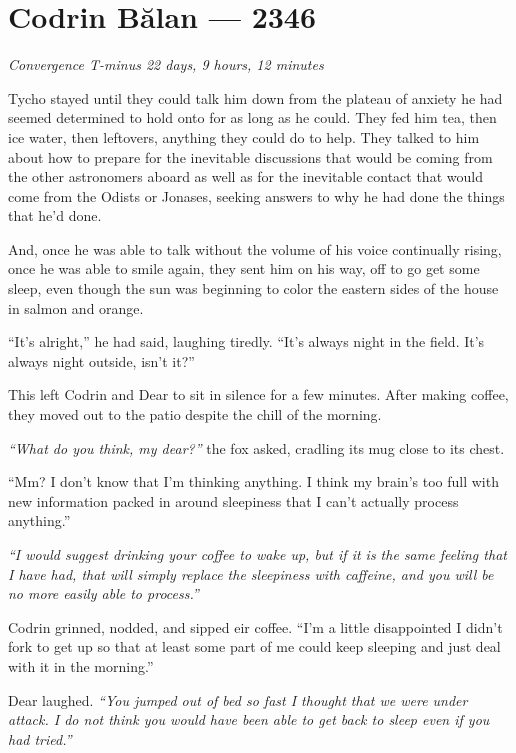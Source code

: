 \hypertarget{codrin-bux103lan-2346}{%
\chapter{Codrin Bălan — 2346}}

\begin{center}
\emph{Convergence T-minus 22 days, 9 hours, 12 minutes}
\end{center}

\noindent Tycho stayed until they could talk him down from the plateau of anxiety he had seemed determined to hold onto for as long as he could. They fed him tea, then ice water, then leftovers, anything they could do to help. They talked to him about how to prepare for the inevitable discussions that would be coming from the other astronomers aboard as well as for the inevitable contact that would come from the Odists or Jonases, seeking answers to why he had done the things that he'd done.

And, once he was able to talk without the volume of his voice continually rising, once he was able to smile again, they sent him on his way, off to go get some sleep, even though the sun was beginning to color the eastern sides of the house in salmon and orange.

``It's alright,'' he had said, laughing tiredly. ``It's always night in the field. It's always night outside, isn't it?''

This left Codrin and Dear to sit in silence for a few minutes. After making coffee, they moved out to the patio despite the chill of the morning.

\emph{``What do you think, my dear?''} the fox asked, cradling its mug close to its chest.

``Mm? I don't know that I'm thinking anything. I think my brain's too full with new information packed in around sleepiness that I can't actually process anything.''

\emph{``I would suggest drinking your coffee to wake up, but if it is the same feeling that I have had, that will simply replace the sleepiness with caffeine, and you will be no more easily able to process.''}

Codrin grinned, nodded, and sipped eir coffee. ``I'm a little disappointed I didn't fork to get up so that at least some part of me could keep sleeping and just deal with it in the morning.''

Dear laughed. \emph{``You jumped out of bed so fast I thought that we were under attack. I do not think you would have been able to get back to sleep even if you had tried.''}

